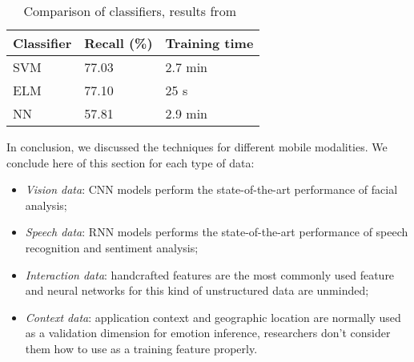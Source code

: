 \begin{table}
  \caption{Comparison of classifiers, results from~\cite{d2015review}}
  \label{tab:classifier}
  \scriptsize
  \begin{center}
    \begin{tabular}{lll}
      Classifier & Recall (\%) & Training time \\
    \hline
    SVM                   & 77.03         &  2.7 min    \\
    ELM                & 77.10         &   25 s    \\
    NN                 & 57.81         &  2.9 min    \\
    \end{tabular}
  \end{center}
\end{table}

In conclusion, we discussed the techniques for different mobile modalities. We conclude here of this section for each type of data:

\begin{itemize}
  \item \emph{Vision data}: CNN models perform the state-of-the-art performance of facial analysis;
  \item \emph{Speech data}: RNN models performs the state-of-the-art performance of speech recognition and sentiment analysis;
  \item \emph{Interaction data}: handcrafted features are the most commonly used feature and neural networks for this kind of unstructured data are unminded;
  \item  \emph{Context data}: application context and geographic location are normally used as a validation dimension for emotion inference, researchers don't consider them how to use as a training feature properly.
\end{itemize}